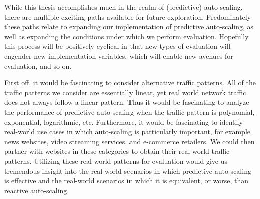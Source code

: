 While this thesis accomplishes much in the realm of (predictive) auto-scaling,
there are multiple exciting paths
available for future exploration. Predominately these paths relate to expanding
our implementation of predictive auto-scaling, as well as expanding the
conditions under which we perform evaluation. Hopefully this process will be
positively cyclical in that new types of evaluation will engender new
implementation variables, which will enable new avenues for evaluation, and so
on.

First off, it would be fascinating to consider alternative traffic patterns.
All of the traffic patterns we consider are essentially linear, yet real
world network traffic does not always follow a linear pattern. Thus it would be
fascinating to analyze the performance of predictive auto-scaling when the
traffic pattern is polynomial, exponential, logarithmic, etc. Furthermore, it
would be fascinating to identify real-world use cases in which auto-scaling is
particularly important, for example news websites, video streaming services, and
e-commerce retailers. We could then partner with websites in these categories to
obtain their real world traffic patterns. Utilizing these real-world patterns
for evaluation
would give us tremendous insight into the real-world scenarios in which
predictive auto-scaling is effective and the real-world scenarios in which it is
equivalent, or worse, than reactive auto-scaling.

